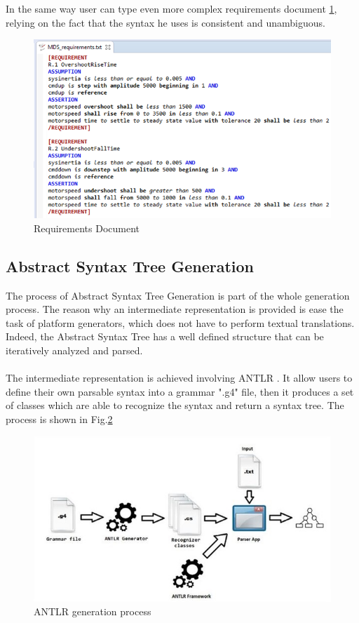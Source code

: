 In the same way user can type even more complex requirements document \ref{fig:reqdoc}, relying on the fact that the syntax he uses is consistent and unambiguous.
\begin{figure}[h]
\centering
\includegraphics[width=.75\textwidth]{Figs/recdoc.png}
\caption{Requirements Document}
\label{fig:reqdoc}
\end{figure}


\subsection{Abstract Syntax Tree Generation}
\label{sec:ast}

The process of Abstract Syntax Tree Generation is part of the whole generation process. The reason why an intermediate representation is provided is ease the task of platform generators, which does not have to perform textual translations. Indeed, the Abstract Syntax Tree has a well defined structure that can be iteratively analyzed and parsed.
\paragraph{} The intermediate representation is achieved involving ANTLR \citep{antlr}. It allow users to define their own parsable syntax into a  grammar ".g4" file, then it produces a set of classes which are able to recognize the syntax and return a syntax tree. The process is shown in Fig.\ref{fig:antlrp}

\begin{figure}[!h]
\centering
\includegraphics[width=.7\textwidth]{Figs/antlrprocess.jpg}
\caption{ANTLR generation process}
\label{fig:antlrp}
\end{figure}

